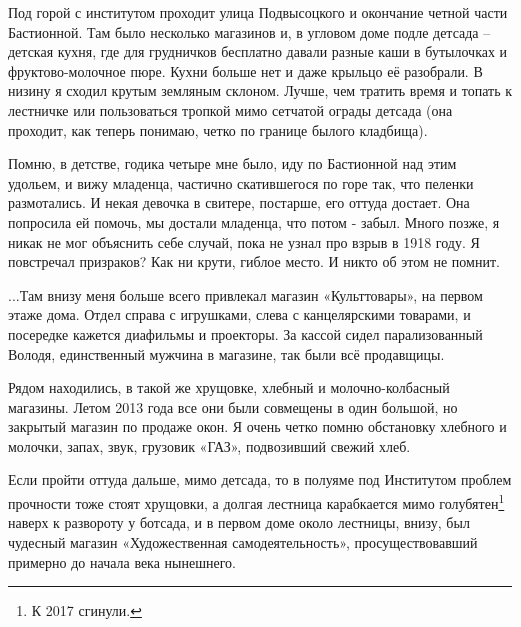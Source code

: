 Под горой с институтом проходит улица Подвысоцкого и окончание четной части Бастионной. Там было несколько магазинов и, в угловом доме подле детсада – детская кухня, где для грудничков бесплатно давали разные каши в бутылочках и фруктово-молочное пюре. Кухни больше нет и даже крыльцо её разобрали. В низину я сходил крутым земляным склоном. Лучше, чем тратить время и топать к лестничке или пользоваться тропкой мимо сетчатой ограды детсада (она проходит, как теперь понимаю, четко по границе былого кладбища).

Помню, в детстве, годика четыре мне было, иду по Бастионной над этим удольем, и вижу младенца, частично скатившегося по горе так, что пеленки размотались. И некая девочка в свитере, постарше, его оттуда достает. Она попросила ей помочь, мы достали младенца, что потом - забыл. Много позже, я никак не мог объяснить себе случай, пока не узнал про взрыв в 1918 году. Я повстречал призраков? Как ни крути, гиблое место. И никто об этом не помнит.

...Там внизу меня больше всего привлекал магазин «Культтовары», на первом этаже дома. Отдел справа с игрушками, слева с канцелярскими товарами, и посередке кажется диафильмы и проекторы. За кассой сидел парализованный Володя, единственный мужчина в магазине, так были всё продавщицы.

Рядом находились, в такой же хрущовке, хлебный и молочно-колбасный магазины. Летом 2013 года все они были совмещены в один большой, но закрытый магазин по продаже окон. Я очень четко помню обстановку хлебного и молочки, запах, звук, грузовик «ГАЗ», подвозивший свежий хлеб.

Если пройти оттуда дальше, мимо детсада, то в полуяме под Институтом проблем прочности тоже стоят хрущовки, а долгая лестница карабкается мимо голубятен\footnote{К 2017 сгинули.} наверх к развороту у ботсада, и в первом доме около лестницы, внизу, был чудесный магазин «Художественная самодеятельность», просуществовавший примерно до начала века нынешнего. 

